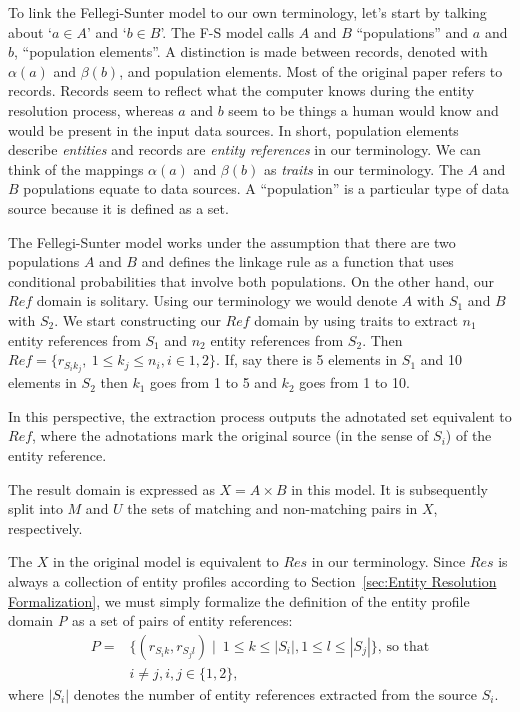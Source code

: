 To link the Fellegi-Sunter model to our own terminology, let's start by talking
about `$a \in A$' and `$b \in B$'.
The F-S model calls $A$ and $B$ ``populations'' and $a$ and $b$,
``population elements''.
A distinction is made between records, denoted with $\alpha(a)$ and
$\beta(b)$, and population elements.
Most of the original paper refers to records.
Records seem to reflect what the computer knows during the entity resolution
process, whereas $a$ and $b$ seem to be things a human would know and would be
present in the input data sources.
In short, population elements describe \textit{entities} and records are
\textit{entity references} in our terminology.
We can think of the mappings $\alpha(a)$ and $\beta(b)$ as \textit{traits} in
our terminology.
The $A$ and $B$ populations equate to data sources.
A ``population'' is a particular type of data source because it is defined
as a set.

The Fellegi-Sunter model works under the assumption that there are two
populations $A$ and $B$ and defines the linkage rule as a function that uses
conditional probabilities that involve both populations.
On the other hand, our $Ref$ domain is solitary.
Using our terminology we would denote $A$ with $S_1$ and $B$ with $S_2$.
We start constructing our $Ref$ domain by using traits to extract $n_1$
entity references from $S_1$ and $n_2$ entity references from $S_2$.
Then $Ref = \{r_{{S_i}{k_j}},~1 \leq k_j \leq n_i, i \in {1, 2} \}$.
If, say there is 5 elements in $S_1$ and 10 elements in $S_2$ then $k_1$ goes
from 1 to 5 and $k_2$ goes from 1 to 10.

In this perspective, the extraction process outputs the adnotated set equivalent
to $Ref$, where the adnotations mark the original source (in the sense of $S_i$)
of the entity reference.

The result domain is expressed as $X = A \times B$ in this model.
It is subsequently split into $M$ and $U$ the sets of matching and
non-matching pairs in $X$, respectively.

The $X$ in the original model is equivalent to $Res$ in our terminology.
Since $Res$ is always a collection of entity profiles according to
Section~\ref{sec:Entity Resolution Formalization}, we must simply formalize the definition
of the entity profile domain \textit{P} as a set of pairs of entity references:
\begin{align}
    P = &\{(r_{{S_i}{k}}, r_{{S_j}{l}})\mid~1 \leq k \leq |S_i|,
    1 \leq l \leq |S_j|\}\textrm{, so that}\nonumber\\
    &i \neq j, i,j \in \{1, 2\}\textrm{,}\nonumber
\end{align}
where $|S_i|$ denotes the number of entity references extracted from the
source $S_i$.

